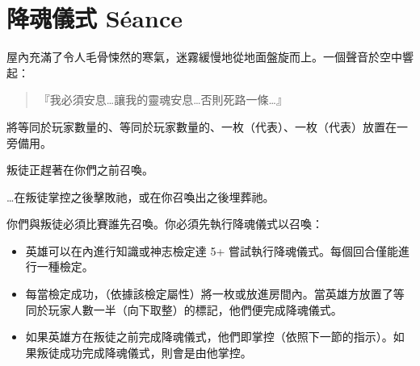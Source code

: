 
\chapter{降魂儀式 Séance}

\begin{HauntStory}
  屋內充滿了令人毛骨悚然的寒氣，迷霧緩慢地從地面盤旋而上。一個聲音於空中響起：
  \begin{quote}
    『我必須安息…讓我的靈魂安息…否則死路一條…』
  \end{quote}
\end{HauntStory}

將等同於玩家數量的、等同於玩家數量的、一枚（代表）、一枚（代表）放置在一旁備用。

叛徒正趕著在你們之前召喚。

…在叛徒掌控之後擊敗祂，或在你召喚出之後埋葬祂。

你們與叛徒必須比賽誰先召喚。你必須先執行降魂儀式以召喚：
\begin{itemize}
  \item 英雄可以在內進行知識或神志檢定達 5+ 嘗試執行降魂儀式。每個回合僅能進行一種檢定。
  \item 每當檢定成功，（依據該檢定屬性）將一枚或放進房間內。當英雄方放置了等同於玩家人數一半（向下取整）的標記，他們便完成降魂儀式。
  \item 如果英雄方在叛徒之前完成降魂儀式，他們即掌控（依照下一節的指示）。如果叛徒成功完成降魂儀式，則會是由他掌控。
\end{itemize}

\vfill\null\pagebreak

